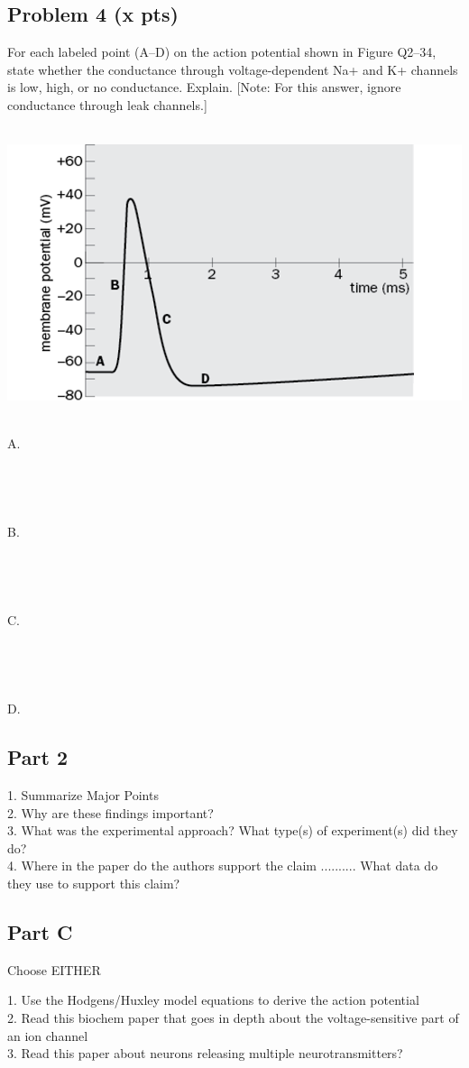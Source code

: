 \documentclass{article}
\begin{document}
\pagebreak{}
\subsection*{Problem 4 (x pts)}
For each labeled point (A–D) on the action potential shown in Figure Q2–34, state whether the conductance through voltage-dependent Na+ and K+ channels is low, high, or no conductance. Explain. [Note: For this answer, ignore conductance through leak channels.]\\\\
\begin{center}
\includegraphics[scale = .8]{action_potential_with_axis.png}\\
\end{center}
\\
A.\\\\\\\\\\
B.\\\\\\\\\\
C.\\\\\\\\\\
D.

\subsection*{Part 2}
1. Summarize Major Points\\
2. Why are these findings important?\\
3. What was the experimental approach? What type(s) of experiment(s) did they do?\\
4. Where in the paper do the authors support the claim .......... What data do they use to support this claim?

\subsection*{Part C}
Choose EITHER

1. Use the Hodgens/Huxley model equations to derive the action potential\\
2. Read this biochem paper that goes in depth about the voltage-sensitive part of an ion channel\\
3. Read this paper about neurons releasing multiple neurotransmitters?
\end{document}
